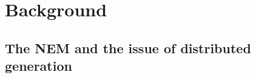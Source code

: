 \chapter{Background}\label{chap:background}

\section{The NEM and the issue of distributed generation}\label{sec:NEM_background}

